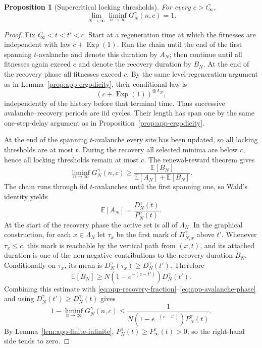 \documentclass[11pt,a4paper]{amsart}
\newtheorem{proposition}[theorem]{Proposition}
\theoremstyle{remark}
\begin{document}
\begin{proposition}[Supercritical locking thresholds]
\label{prop:app-locking-above}
For every $c>t_\infty^\gamma$,
\[
        \lim_{N\to\infty}
        \liminf_{n\to\infty}G_N^\gamma(n,c)=1.
\]
\end{proposition}

\begin{proof}
Fix $t_\infty^\gamma<t<t'<c$. Start at a regeneration time at
which the fitnesses are independent with law
$c+\operatorname{Exp}(1)$. Run the chain until the end of the first
spanning $t$-avalanche and denote this duration by $A_N$; then continue
until all fitnesses again exceed $c$ and denote the recovery duration by
$B_N$. 
At the end of the recovery phase all fitnesses exceed \(c\).
By the same level-regeneration argument as in Lemma~\ref{prop:app-ergodicity},
their conditional law is
\[
        (c+\operatorname{Exp}(1))^{\otimes\Lambda_N},
\]
independently of the history before that terminal time. Thus successive
avalanche--recovery periods are iid cycles. Their length has span one by
the same one-step-delay argument as in Proposition~\ref{prop:app-ergodicity}.




At the end of the spanning $t$-avalanche every site has been updated, so
all locking thresholds are at most $t$. During the recovery all selected
minima are below $c$, hence all locking thresholds remain at most $c$.
The renewal-reward theorem gives
\begin{equation}
\label{eq:app-recovery-fraction}
        \liminf_{n\to\infty}G_N^\gamma(n,c)
        \geq
        \frac{\mathbb{E}[B_N]}{\mathbb{E}[A_N]+\mathbb{E}[B_N]}.
\end{equation}
The chain runs through iid $t$-avalanches until the first spanning one, so
Wald's identity yields
\begin{equation}
\label{eq:app-avalanche-phase}
        \mathbb{E}[A_N]
        =
        \frac{D_N^\gamma(t)}{P_N^\gamma(t)}.
\end{equation}
At the start of the recovery phase the active set is all of $\Lambda_N$.
In the graphical construction, for each $x\in\Lambda_N$ let $\tau_x$ be
the first mark of $\Pi_{N,x}^\gamma$ above $t'$. Whenever
$\tau_x\leq c$, this mark is reachable by the vertical path from $(x,t)$,
and its attached duration is one of the non-negative contributions to the
recovery duration $B_N$. Conditionally on $\tau_x$, its mean is
$D_N^\gamma(\tau_x)\geq D_N^\gamma(t')$. Therefore
\[
        \mathbb{E}[B_N]
        \geq
        N(1-e^{-(c-t')})D_N^\gamma(t').
\]
Combining this estimate with
\eqref{eq:app-recovery-fraction}--\eqref{eq:app-avalanche-phase} and using
$D_N^\gamma(t')\geq D_N^\gamma(t)$ gives
\[
        1-\liminf_{n\to\infty}G_N^\gamma(n,c)
        \leq
        \frac{1}
        {N(1-e^{-(c-t')})P_N^\gamma(t)}.
\]
By Lemma~\ref{lem:app-finite-infinite},
$P_N^\gamma(t)\geq P_\infty^\gamma(t)>0$, so the right-hand side tends
to zero.
\end{proof}
\end{document}
